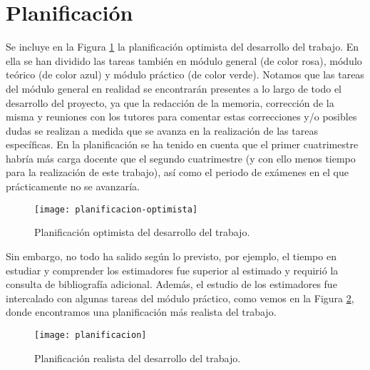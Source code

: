 \documentclass[12pt,a4paper]{report} %
\theoremstyle{definition}
\begin{document}
\section{Planificación}

Se incluye en la Figura \ref{fig:plan} la planificación optimista del desarrollo del trabajo. En ella se han dividido las tareas también en módulo general (de color rosa), módulo teórico (de color azul) y módulo práctico (de color verde). Notamos que las tareas del módulo general en realidad se encontrarán presentes a lo largo de todo el desarrollo del proyecto, ya que la redacción de la memoria, corrección de la misma y reuniones con los tutores para comentar estas correcciones y/o posibles dudas se realizan a medida que se avanza en la realización de las tareas específicas. En la planificación se ha tenido en cuenta que el primer cuatrimestre habría más carga docente  que el segundo cuatrimestre (y con ello menos tiempo para la realización de este trabajo), así como el periodo de exámenes en el que prácticamente no se avanzaría. \\

\begin{figure}[!htb]
    \centering
  \centerline{  \texttt{[image: planificacion-optimista]}}
    \caption{Planificación optimista del desarrollo del trabajo.}
    \label{fig:plan}
\end{figure}

Sin embargo, no todo ha salido según lo previsto, por ejemplo, el tiempo en estudiar y comprender los estimadores fue superior al estimado y requirió la consulta de bibliografía adicional. Además, el estudio de los estimadores fue intercalado con algunas tareas del módulo práctico, como vemos en la Figura \ref{fig:plan2}, donde encontramos una planificación más realista del trabajo.\\

\begin{figure}[!htb]
    \centering
  \centerline{  \texttt{[image: planificacion]}}
    \caption{Planificación realista del desarrollo del trabajo.}
    \label{fig:plan2}
\end{figure}


\newpage
\printbibliography
\end{document}
